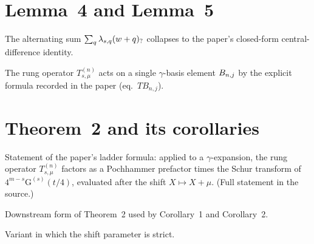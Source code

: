 \section{Lemma~4 and Lemma~5}

\begin{lemma}
  \label{lem:central_difference_identity}
  \leanok
  The alternating sum
  $\sum_{q} \lambda_{s,q} (w+q)_{?}$ collapses to the paper's
  closed-form central-difference identity.
\end{lemma}

\begin{lemma}
  \label{lem:rung_action_on_gamma_basis}
  \leanok
  The rung operator $T_{s,\mu}^{(n)}$ acts on a single $\gamma$-basis
  element $B_{n,j}$ by the explicit formula recorded in the
  paper (eq.~$T B_{n,j}$).
\end{lemma}

\section{Theorem~2 and its corollaries}

\begin{theorem}
  \label{thm:ladder_formula}
  \leanok
  Statement of the paper's ladder formula: applied to a $\gamma$-expansion,
  the rung operator $T_{s,\mu}^{(n)}$ factors as a Pochhammer prefactor
  times the Schur transform of
  $4^{m-s}\mathrm{G}^{(s)}(t/4)$, evaluated after the shift $X\mapsto X+\mu$.
  (Full statement in the source.)
\end{theorem}

\begin{theorem}
  \label{thm:pochhammer_kernel_ladder}
  \leanok
  Downstream form of Theorem~2 used by Corollary~1 and Corollary~2.
\end{theorem}

\begin{theorem}
  \label{thm:pochhammer_kernel_ladder_strict_shift}
  \leanok
  Variant in which the shift parameter is strict.
\end{theorem}

